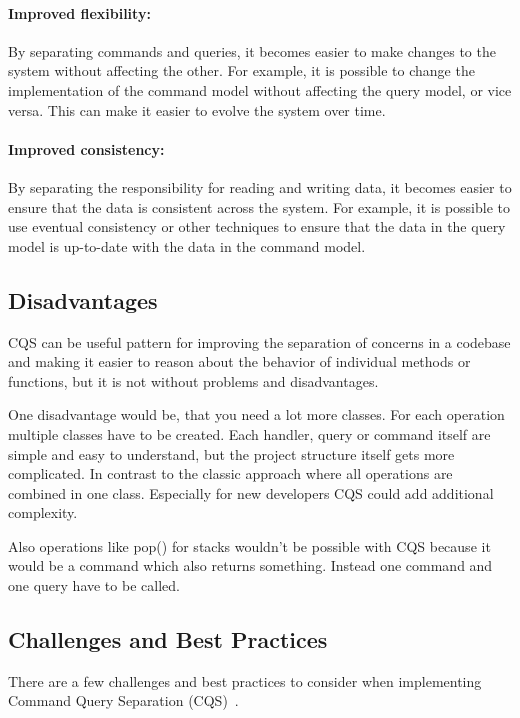\documentclass[11pt,conference]{IEEEtran}
\begin{document}
\paragraph{Improved flexibility:}
By separating commands and queries, it becomes easier to make changes to the system without affecting the other. For example, it is possible to change the implementation of the command model without affecting the query model, or vice versa. This can make it easier to evolve the system over time.

\paragraph{Improved consistency:}
 By separating the responsibility for reading and writing data, it becomes easier to ensure that the data is consistent across the system. For example, it is possible to use eventual consistency or other techniques to ensure that the data in the query model is up-to-date with the data in the command model.

\subsection{Disadvantages}

CQS can be useful pattern for improving the separation of concerns in a codebase and making it easier to reason about the behavior of individual methods or functions, but it is not without problems and disadvantages.

One disadvantage would be, that you need a lot more classes.
For each operation multiple classes have to be created.
Each handler, query or command itself are simple and easy to understand, but the project structure itself gets more complicated.
In contrast to the classic approach where all operations are combined in one class.
Especially for new developers CQS could add additional complexity.

Also operations like pop() for stacks wouldn't be possible with CQS because it would be a command which also returns something.
Instead one command and one query have to be called.

\subsection{Challenges and Best Practices}

There are a few challenges and best practices to consider when implementing Command Query Separation (CQS)~\cite{martinfowler-cqs}.
\end{document}

